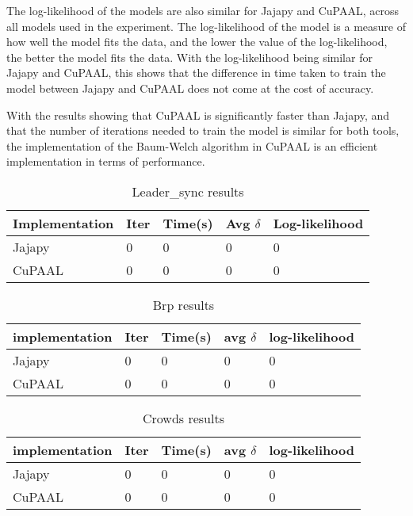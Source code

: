 The log-likelihood of the models are also similar for Jajapy and CuPAAL, across all models used in the experiment.
The log-likelihood of the model is a measure of how well the model fits the data, and the lower the value of the log-likelihood, the better the model fits the data.
With the log-likelihood being similar for Jajapy and CuPAAL, this shows that the difference in time taken to train the model between Jajapy and CuPAAL does not come at the cost of accuracy.

With the results showing that CuPAAL is significantly faster than Jajapy, and that the number of iterations needed to train the model is similar for both tools, the implementation of the Baum-Welch algorithm in CuPAAL is an efficient implementation in terms of performance.


\begin{table}[!htb]
    \centering
    \caption{Leader\_sync results}
    \label{tab:leader_results}
    \begin{tabular}{lllll}
        \toprule
        Implementation & Iter & Time(s) & Avg $\delta$ & Log-likelihood \\
        \midrule
        Jajapy         & 0    & 0       & 0            & 0              \\
        CuPAAL         & 0    & 0       & 0            & 0              \\
        \bottomrule
    \end{tabular}
\end{table}

\begin{table}[!htb]
    \centering
    \caption{Brp results}
    \label{tab:brp_results}
    \begin{tabular}{lllll}
        \toprule
        implementation & Iter & Time(s) & avg $\delta$ & log-likelihood \\
        \midrule
        Jajapy         & 0    & 0       & 0            & 0              \\
        CuPAAL         & 0    & 0       & 0            & 0              \\
        \bottomrule
    \end{tabular}
\end{table}

\begin{table}[!htb]
    \centering
    \caption{Crowds results}
    \label{tab:crowds_results}
    \begin{tabular}{lllll}
        \toprule
        implementation & Iter & Time(s) & avg $\delta$ & log-likelihood \\
        \midrule
        Jajapy         & 0    & 0       & 0            & 0              \\
        CuPAAL         & 0    & 0       & 0            & 0              \\
        \bottomrule
    \end{tabular}
\end{table}

